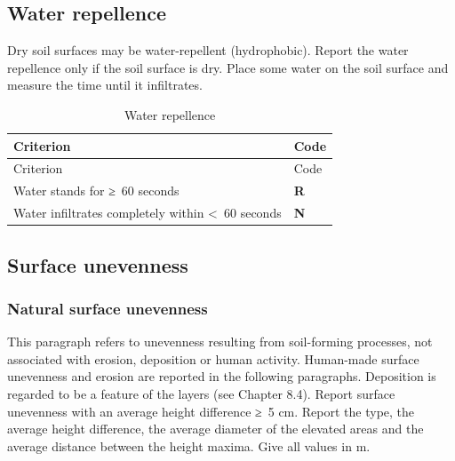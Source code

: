 \documentclass[
  letterpaper,
  DIV=11,
  numbers=noendperiod]{scrreprt}
\begin{document}
\hypertarget{water-repellence}{%
\subsection{Water repellence}\label{water-repellence}}

Dry soil surfaces may be water-repellent (hydrophobic). Report the water
repellence only if the soil surface is dry. Place some water on the soil
surface and measure the time until it infiltrates.

\begin{longtable}[]{@{}ll@{}}
\caption{Water repellence}\tabularnewline
\toprule()
Criterion & Code \\
\midrule()
\endfirsthead
\toprule()
Criterion & Code \\
\midrule()
\endhead
Water stands for ≥~60 seconds & \textbf{R} \\
Water infiltrates completely within \textless~60 seconds & \textbf{N} \\
\bottomrule()
\end{longtable}

\hypertarget{surface-unevenness}{%
\subsection{Surface unevenness}\label{surface-unevenness}}

\hypertarget{natural-surface-unevenness}{%
\subsubsection{Natural surface
unevenness}\label{natural-surface-unevenness}}

This paragraph refers to unevenness resulting from soil-forming
processes, not associated with erosion, deposition or human activity.
Human-made surface unevenness and erosion are reported in the following
paragraphs. Deposition is regarded to be a feature of the layers (see
Chapter 8.4). Report surface unevenness with an average height
difference ≥~5 cm. Report the type, the average height difference, the
average diameter of the elevated areas and the average distance between
the height maxima. Give all values in m.
\end{document}
